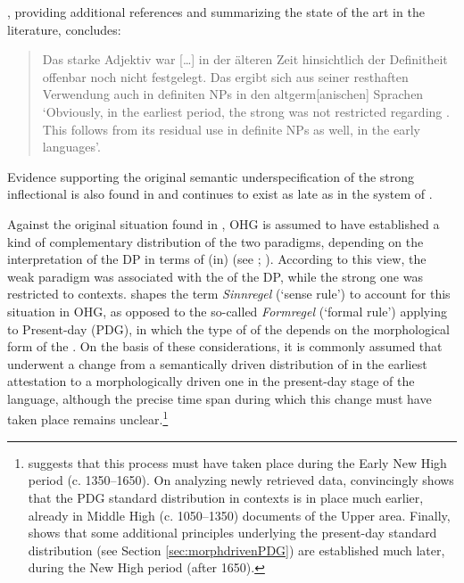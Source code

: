 \documentclass[output=paper,colorlinks,citecolor=brown]{langscibook}
\begin{document}
\citet[196]{klein2007semantischen}, providing additional references and summarizing the state of the art in the literature, concludes:

\begin{quotation}
Das starke Adjektiv war […] in der älteren Zeit hinsichtlich der Definitheit offenbar noch nicht festgelegt. Das ergibt sich aus seiner resthaften Verwendung auch in definiten NPs in den altgerm[anischen] Sprachen
\glt `Obviously, in the earliest period, the strong  was not restricted regarding . This follows from its residual use in definite NPs as well, in the early  languages'.
\end{quotation}

Evidence supporting the original semantic underspecification of the strong inflectional  is also found in  \citep[143--144, 167]{ratkus2011} and continues to exist as late as in the system of  \citep{StrohWollinSimke14}.

Against the original situation found in , OHG is assumed to have established a kind of complementary distribution of the two paradigms, depending on the interpretation of the DP in terms of (in) (see \cite{Demske01}; \cite[297]{Braune2018AHD}). According to this view, the weak paradigm was associated with the  of the DP, while the strong one was restricted to  contexts. \citet{Hotzenkocherle68} shapes the term \textit{Sinnregel} (‘sense rule’) to account for this situation in OHG, as opposed to the so-called \textit{Formregel} (‘formal rule’) applying to Present-day  (PDG), in which the type of  of the  depends on the morphological form of the . On the basis of these considerations, it is commonly assumed that  underwent a change from a semantically driven distribution of  in the earliest attestation to a morphologically driven one in the present-day stage of the language, although the precise time span during which this change must have taken place remains unclear.\footnote{\citet{Demske01}  suggests that this process must have taken place during the Early New High  period (c. 1350--1650). On analyzing newly retrieved  data, \citet{klein2007semantischen} convincingly shows that the PDG standard distribution in  contexts is in place much earlier, already in Middle High  (c. 1050–1350) documents of the Upper  area. Finally, \citet{Sahel2022}  shows that some additional principles underlying the present-day standard distribution (see Section \ref{sec:morphdrivenPDG}) are established much later, during the New High  period (after 1650).}
\end{document}
